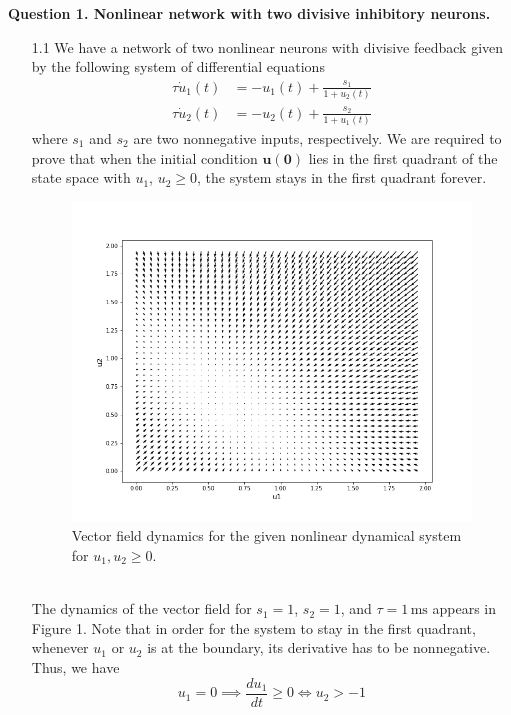 \documentclass[12pt]{article}
\begin{document}
\noindent


\noindent\textbf{Question 1. Nonlinear network with two divisive inhibitory neurons.}
\begin{enumerate}
\item[1.1] We have a network of two nonlinear neurons with divisive feedback given by the following system of differential equations
\begin{align*}
    \tau \dot{u}_{1}(t) &= -u_{1}(t) + \frac{s_{1}}{1+u_{2}(t)}\\
    \tau \dot{u}_{2}(t) &= -u_{2}(t) + \frac{s_{2}}{1+u_{1}(t)}
\end{align*}
where $s_{1}$ and $s_{2}$ are two nonnegative inputs, respectively. We are required to prove that 
when the initial condition $\mathbf{u}(\mathbf{0})$ lies in the first quadrant of the state space with $u_{1}$, $u_{2} \geq 0$, the system stays in the first quadrant forever.
\begin{figure}[h!]
    \centering
    \includegraphics[width=1\textwidth]{./fig1.png}
    \caption{Vector field dynamics for the given nonlinear dynamical system for $u_{1}, u_{2} \geq 0$.}
\end{figure}\\
\noindent The dynamics of the vector field for $s_{1}=1$, $s_{2}=1$, and $\tau = 1 \, \text{ms}$ appears in Figure 1.
Note that in order for the system to stay in the first quadrant, whenever $u_{1}$ or $u_{2}$ is at the boundary, its derivative has to be nonnegative.
Thus, we have
\[
    u_{1}=0 \implies \frac{du_{1}}{dt} \geq 0 \Leftrightarrow u_{2} > -1
\]
\[
\]
\end{enumerate}
\end{document}
